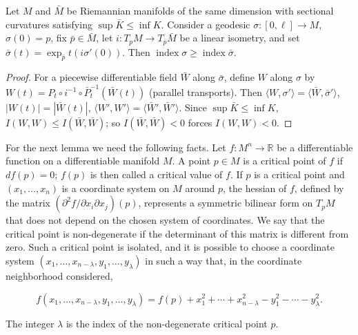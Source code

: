 \begin{lemma}
  \label{lem:dc-ch13-3-2}
  Let $M$ and $\bar M$ be Riemannian manifolds of the same dimension with sectional
  curvatures satisfying $\sup\bar K\leq\inf K$. Consider a geodesic
  $\sigma:[0,\ell]\to M$, $\sigma(0)=p$, fix $\bar p\in\bar M$, let
  $i:T_pM\to T_{\bar p}\bar M$ be a linear isometry, and set
  $\bar\sigma(t)=\exp_{\bar p}t(i\sigma'(0))$. Then
  $\operatorname{index}\sigma\geq\operatorname{index}\bar\sigma$.
\end{lemma}
\begin{proof}
\sketch
  For a piecewise differentiable field $\bar W$ along $\bar\sigma$, define
  $W$ along $\sigma$ by $W(t)=P_t\circ i^{-1}\circ\bar P_t^{-1}(\bar W(t))$ (parallel
  transports). Then $\langle W,\sigma'\rangle=\langle\bar W,\bar\sigma'\rangle$,
  $|W(t)|=|\bar W(t)|$, $\langle W',W'\rangle=\langle\bar W',\bar W'\rangle$. Since
  $\sup\bar K\leq\inf K$, $I(W,W)\leq I(\bar W,\bar W)$; so $I(\bar W,\bar W)<0$ forces
  $I(W,W)<0$.
\end{proof}

For the next lemma we need the following facts. Let $f:M^n\to\mathbb{R}$ be a
differentiable function on a differentiable manifold $M$. A point $p\in M$ is a
critical point of $f$ if $df(p)=0$; $f(p)$ is then called a critical value of $f$.
If $p$ is a critical point and $(x_1,\dots,x_n)$ is a coordinate system on $M$
around $p$, the hessian of $f$, defined by the matrix
$(\partial^2f/\partial x_i\partial x_j)(p)$, represents a symmetric bilinear form
on $T_pM$ that does not depend on the chosen system of coordinates. We say that
the critical point is non-degenerate if the determinant of this matrix is
different from zero. Such a critical point is isolated, and it is possible to
choose a coordinate system $(x_1,\dots,x_{n-\lambda},y_1,\dots,y_\lambda)$ in such
a way that, in the coordinate neighborhood considered,

$$
f(x_1,\dots,x_{n-\lambda},y_1,\dots,y_\lambda)
=f(p)+x_1^2+\cdots+x_{n-\lambda}^2-y_1^2-\cdots-y_\lambda^2.
$$

The integer $\lambda$ is the index of the non-degenerate critical point $p$.

